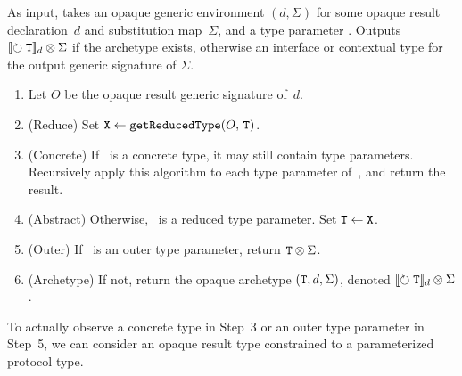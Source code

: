 \documentclass[../generics]{subfiles}
\begin{document}
\begin{algorithm}\label{map into opaque alg}
As input, takes an opaque generic environment $(d, \Sigma)$ for some opaque result declaration~$d$ and substitution map~$\Sigma$, and a type parameter \tT. Outputs $[\![\circlearrowright \texttt{\texttt{T}}]\!]_d \otimes \Sigma$ if the archetype exists, otherwise an interface or contextual type for the output generic signature of $\Sigma$.
\begin{enumerate}
\item Let $O$ be the opaque result generic signature of~$d$.
\item (Reduce) Set $\texttt{X}\leftarrow\texttt{getReducedType}(O,\,\texttt{T})$.
\item (Concrete) If \tX\ is a concrete type, it may still contain type parameters. Recursively apply this algorithm to each type parameter of~\tX, and return the result.
\item (Abstract) Otherwise, \tX\ is a reduced type parameter. Set $\texttt{T}\leftarrow\texttt{X}$.
\item (Outer) If \tT\ is an outer type parameter, return $\texttt{T}\otimes\Sigma$.
\item (Archetype) If not, return the opaque archetype $(\texttt{T},d,\Sigma)$, denoted $[\![\circlearrowright \texttt{\texttt{T}}]\!]_d \otimes \Sigma$.
\end{enumerate}
\end{algorithm}

To actually observe a concrete type in Step~3 or an outer type parameter in Step~5, we can consider an opaque result type constrained to a parameterized protocol type.
\end{document}
